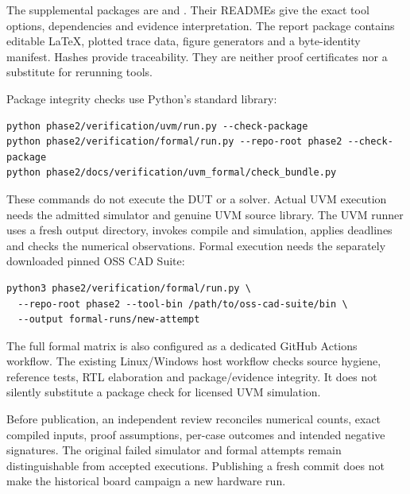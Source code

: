 The supplemental packages are  and . Their READMEs give the exact tool options, dependencies and evidence interpretation. The report package contains editable LaTeX, plotted trace data, figure generators and a byte-identity manifest. Hashes provide traceability. They are neither proof certificates nor a substitute for rerunning tools.

Package integrity checks use Python's standard library:
\begin{lstlisting}
python phase2/verification/uvm/run.py --check-package
python phase2/verification/formal/run.py --repo-root phase2 --check-package
python phase2/docs/verification/uvm_formal/check_bundle.py
\end{lstlisting}
These commands do not execute the DUT or a solver. Actual UVM execution needs the admitted simulator and genuine UVM source library. The UVM runner uses a fresh output directory, invokes compile and simulation, applies deadlines and checks the numerical observations. Formal execution needs the separately downloaded pinned OSS CAD Suite:
\begin{lstlisting}
python3 phase2/verification/formal/run.py \
  --repo-root phase2 --tool-bin /path/to/oss-cad-suite/bin \
  --output formal-runs/new-attempt
\end{lstlisting}
The full formal matrix is also configured as a dedicated GitHub Actions workflow. The existing Linux/Windows host workflow checks source hygiene, reference tests, RTL elaboration and package/evidence integrity. It does not silently substitute a package check for licensed UVM simulation.

Before publication, an independent review reconciles numerical counts, exact compiled inputs, proof assumptions, per-case outcomes and intended negative signatures. The original failed simulator and formal attempts remain distinguishable from accepted executions. Publishing a fresh commit does not make the historical board campaign a new hardware run.
